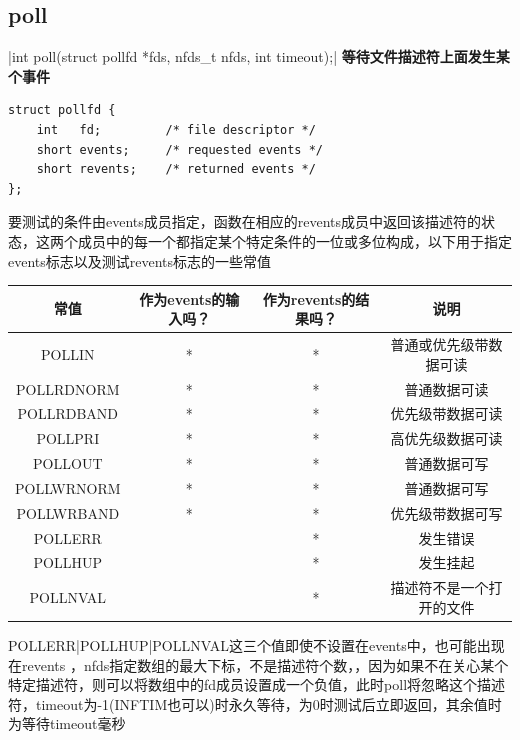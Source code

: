 \subsection{poll}
|int poll(struct pollfd *fds, nfds_t nfds, int timeout);|
\noindent \textbf{等待文件描述符上面发生某个事件}
\begin{verbatim}
struct pollfd {
    int   fd;         /* file descriptor */
    short events;     /* requested events */
    short revents;    /* returned events */
};
\end{verbatim}
\begin{spacing}{2.0}
要测试的条件由events成员指定，函数在相应的revents成员中返回该描述符的状态，这两个成员中的每一个都指定某个特定条件的一位或多位构成，以下用于指定events标志以及测试revents标志的一些常值


\begin{table}[!htb]
	\begin{tabular}{|c|c|c|c|}
	\hline
		常值 & 作为events的输入吗？ & 作为revents的结果吗？& 说明 \\
		\hline
		POLLIN & * & * & 普通或优先级带数据可读\\
		POLLRDNORM & * & * & 普通数据可读\\
		POLLRDBAND & * & * & 优先级带数据可读\\
		POLLPRI & * & * & 高优先级数据可读\\
		\hline
		POLLOUT & * & * & 普通数据可写\\
		POLLWRNORM & * & * & 普通数据可写\\
		POLLWRBAND & * & * & 优先级带数据可写\\
		\hline
		POLLERR &  & * & 发生错误\\
		POLLHUP &  & * & 发生挂起\\
		POLLNVAL &  & * & 描述符不是一个打开的文件\\
		\hline
	\end{tabular}
\end{table}
POLLERR|POLLHUP|POLLNVAL这三个值即使不设置在events中，也可能出现在revents ，nfds指定数组的最大下标，不是描述符个数，，因为如果不在关心某个特定描述符，则可以将数组中的fd成员设置成一个负值，此时poll将忽略这个描述符，timeout为-1(INFTIM也可以)时永久等待，为0时测试后立即返回，其余值时为等待timeout毫秒
\newpage

\end{spacing}
